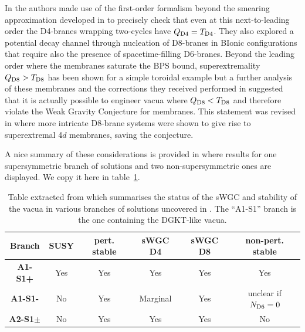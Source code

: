 \documentclass[11pt, a4paper]{article}
\begin{document}
In \cite{Marchesano:2021ycx} the authors made use of the first-order formalism beyond the smearing approximation developed in \cite{Marchesano:2020qvg} to precisely check that even at this next-to-leading order the D4-branes wrapping two-cycles have $Q_{\rm D4}=T_{\rm D4}$. They also explored a potential decay channel through nucleation of D8-branes in BIonic configurations that require also the presence of spacetime-filling D6-branes. Beyond the leading order where the membranes saturate the BPS bound, superextremality $Q_{\rm D8}>T_{\rm D8}$ has been shown for a simple toroidal example but a further analysis of these membranes and the corrections they received performed in \cite{Casas:2022mnz} suggested that it is actually possible to engineer vacua where $Q_{\rm D8}<T_{\rm D8}$ and therefore violate the Weak Gravity Conjecture for membranes. This statement was revised in \cite{Marchesano:2022rpr} where more intricate D8-brane systems were shown to give rise to superextremal 4$d$ membranes, saving the conjecture.

A nice summary of these considerations is provided in \cite[Table 3]{Marchesano:2022rpr} where results for one supersymmetric branch of solutions and two non-supersymmetric ones are displayed. We copy it here in table~\ref{tab:membranes}.

\begin{table}[!ht]
    \centering
    \begin{tabular}{|c||c|c|c|c|c|}
    \hline
    Branch & SUSY & pert. stable & sWGC D4 & sWGC D8 & non-pert. stable\\\hline\hline
    {\bf A1-S1+} & Yes & Yes & Yes & Yes & Yes\\\hline
    {\bf A1-S1-} & No & Yes & Marginal & Yes & unclear if $N_{\rm D6}=0$\\\hline
    {\bf A2-S1$\pm$} & No & Yes & Yes & Yes & No\\\hline
    \end{tabular}
    \caption{Table extracted from \cite{Marchesano:2022rpr} which summarises the status of the sWGC and stability of the vacua in various branches of solutions uncovered in \cite{Marchesano:2019hfb}. The ``A1-S1'' branch is the one containing the DGKT-like vacua.}
    \label{tab:membranes}
\end{table}
\end{document}
